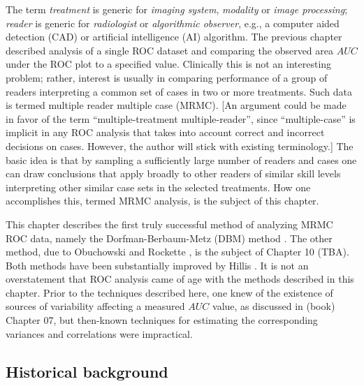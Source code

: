 \documentclass[
]{book}
\begin{document}
The term \emph{treatment} is generic for \emph{imaging system}, \emph{modality} or \emph{image processing}; \emph{reader} is generic for \emph{radiologist} or \emph{algorithmic observer}, e.g., a computer aided detection (CAD) or artificial intelligence (AI) algorithm. The previous chapter described analysis of a single ROC dataset and comparing the observed area \(AUC\) under the ROC plot to a specified value. Clinically this is not an interesting problem; rather, interest is usually in comparing performance of a group of readers interpreting a common set of cases in two or more treatments. Such data is termed multiple reader multiple case (MRMC). {[}An argument could be made in favor of the term ``multiple-treatment multiple-reader'', since ``multiple-case'' is implicit in any ROC analysis that takes into account correct and incorrect decisions on cases. However, the author will stick with existing terminology.{]} The basic idea is that by sampling a sufficiently large number of readers and cases one can draw conclusions that apply broadly to other readers of similar skill levels interpreting other similar case sets in the selected treatments. How one accomplishes this, termed MRMC analysis, is the subject of this chapter.

This chapter describes the first truly successful method of analyzing MRMC ROC data, namely the Dorfman-Berbaum-Metz (DBM) method \citep{RN204}. The other method, due to Obuchowski and Rockette \citep{RN1450}, is the subject of Chapter 10 (TBA). Both methods have been substantially improved by Hillis \citep{RN1866, RN1865, RN2508}. It is not an overstatement that ROC analysis came of age with the methods described in this chapter. Prior to the techniques described here, one knew of the existence of sources of variability affecting a measured \(AUC\) value, as discussed in (book) Chapter 07, but then-known techniques \citep{RN412} for estimating the corresponding variances and correlations were impractical.

\hypertarget{historical-background}{%
\subsection{Historical background}\label{historical-background}}
\end{document}

